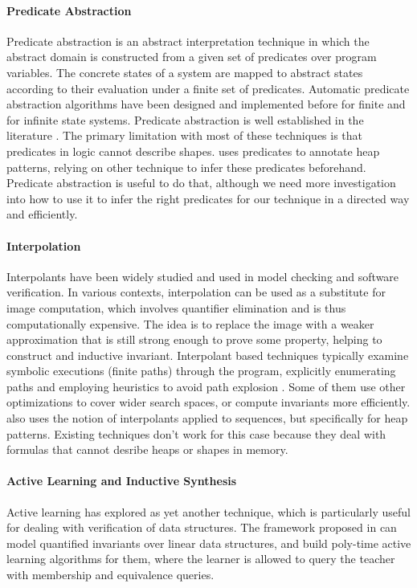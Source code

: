 \paragraph{Predicate Abstraction}
Predicate abstraction is an abstract interpretation technique in which the abstract
domain is constructed from a given set of predicates over program variables. The concrete
states of a system are mapped to abstract states according to their evaluation under a
finite set of predicates. Automatic predicate abstraction algorithms have been designed
and implemented before for finite and for infinite state systems. Predicate abstraction
is well established in the literature \cite{ball01,henzinger02,henzinger04}. The primary
limitation with most of these techniques is that predicates in logic cannot describe
shapes.
\verifier uses predicates to annotate heap patterns, relying on other technique to infer
these predicates beforehand. Predicate abstraction is useful to do that, although we
need more investigation into how to use it to infer the right predicates for our
technique in a directed way and efficiently.

\paragraph{Interpolation}
Interpolants have been widely studied and used in model checking and software
verification. In various contexts, interpolation can be used as a substitute for image
computation, which involves quantifier elimination and is thus computationally
expensive. The idea is to replace the image with a weaker approximation that is still
strong enough to prove some property, helping to construct and inductive invariant.
Interpolant based techniques typically examine symbolic executions (finite paths)
through the program, explicitly enumerating paths and employing heuristics to avoid path
explosion \cite{albarghouthi12,heizmann10,mcmillan06,rummer13}. Some of them use other
optimizations to cover wider search spaces, or compute invariants more efficiently.
\verifier also uses the notion of interpolants applied to sequences, but specifically
for heap patterns. Existing techniques don't work for this case because they deal with
formulas that cannot desribe heaps or shapes in memory.

\paragraph{Active Learning and Inductive Synthesis}
Active learning has explored as yet another technique, which is particularly useful for
dealing with verification of data structures. The framework proposed in \cite{garg13}
can model quantified invariants over linear data structures, and build poly-time active
learning algorithms for them, where the learner is allowed to query the teacher with
membership and equivalence queries.

